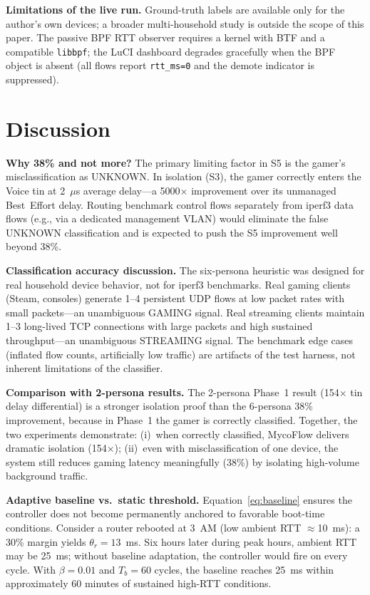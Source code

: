 \documentclass[conference]{IEEEtran}
\begin{document}
\textbf{Limitations of the live run.}
Ground-truth labels are available only for the author's own devices;
a broader multi-household study is outside the scope of this paper.
The passive BPF RTT observer requires a kernel with BTF and a
compatible \texttt{libbpf}; the LuCI dashboard degrades gracefully
when the BPF object is absent (all flows report \texttt{rtt\_ms=0}
and the demote indicator is suppressed).

\section{Discussion}
\label{sec:discussion}

\textbf{Why 38\% and not more?}
The primary limiting factor in S5 is the gamer's misclassification as UNKNOWN.
In isolation (S3), the gamer correctly enters the Voice tin at 2~$\mu$s
average delay—a 5000$\times$ improvement over its unmanaged Best~Effort delay.
Routing benchmark control flows separately from iperf3 data flows
(e.g., via a dedicated management VLAN) would eliminate the false UNKNOWN
classification and is expected to push the S5 improvement well beyond 38\%.

\textbf{Classification accuracy discussion.}
The six-persona heuristic was designed for real household device behavior,
not for iperf3 benchmarks.
Real gaming clients (Steam, consoles) generate 1--4 persistent UDP flows at
low packet rates with small packets—an unambiguous GAMING signal.
Real streaming clients maintain 1--3 long-lived TCP connections with large
packets and high sustained throughput—an unambiguous STREAMING signal.
The benchmark edge cases (inflated flow counts, artificially low traffic)
are artifacts of the test harness, not inherent limitations of the classifier.

\textbf{Comparison with 2-persona results.}
The 2-persona Phase~1 result (154$\times$ tin delay differential) is a
stronger isolation proof than the 6-persona 38\% improvement, because in
Phase~1 the gamer is correctly classified.
Together, the two experiments demonstrate: (i)~when correctly classified,
MycoFlow delivers dramatic isolation (154$\times$); (ii)~even with
misclassification of one device, the system still reduces gaming latency
meaningfully (38\%) by isolating high-volume background traffic.

\textbf{Adaptive baseline vs.\ static threshold.}
Equation~\eqref{eq:baseline} ensures the controller does not become
permanently anchored to favorable boot-time conditions.
Consider a router rebooted at 3~AM (low ambient RTT $\approx$10~ms):
a 30\% margin yields $\theta_r = 13$~ms.
Six hours later during peak hours, ambient RTT may be 25~ms; without
baseline adaptation, the controller would fire on every cycle.
With $\beta = 0.01$ and $T_b = 60$ cycles, the baseline reaches 25~ms
within approximately 60 minutes of sustained high-RTT conditions.
\end{document}
